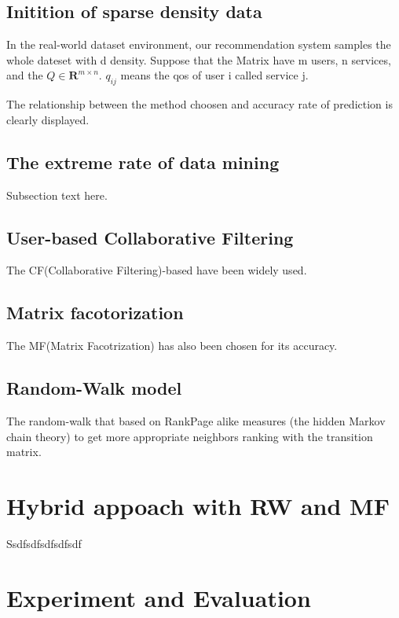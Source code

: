 \documentclass[conference]{IEEEtran}
\begin{document}
\subsection{Initition of sparse density data}
\par In the real-world dataset environment, our recommendation system samples the whole dateset with d density.  Suppose that the Matrix have m users, n services, and the $Q\in \textbf{R}^{m\times n}$. $q_{ij}$ means the qos of user i called service j.


\par The relationship between the method choosen and accuracy rate of prediction is clearly displayed.

\subsection{The extreme rate of data mining}
Subsection text here.

\subsection{User-based Collaborative Filtering}
The CF(Collaborative Filtering)-based have been widely used.

\subsection{Matrix facotorization}
The MF(Matrix Facotrization) has also been chosen for its accuracy.

\subsection{Random-Walk model}
The random-walk that based on RankPage alike measures (the hidden Markov chain theory) to get more appropriate neighbors ranking with the transition matrix.



\section{Hybrid appoach with RW and MF}\label{S-HRWMF}
Ssdfsdfsdfsdfsdf

\section{Experiment and Evaluation}\label{S-EE}
\end{document}
